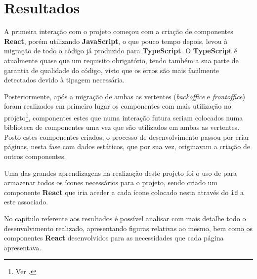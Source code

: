 \section{Resultados}

A primeira interação com o projeto começou com a criação de componentes \textbf{React}, porém utilizando \textbf{JavaScript}, o que pouco tempo depois, levou à migração de todo o código já produzido para \textbf{TypeScript}. O \textbf{TypeScript} é atualmente quase que um requisito obrigatório, tendo também a sua parte de garantia de qualidade do código, visto que os erros são mais facilmente detectados devido à tipagem necessária.

Posteriormente, após a migração de ambas as vertentes (\textit{backoffice} e \textit{frontoffice}) foram realizados em primeiro lugar os componentes com mais utilização no projeto\footnote{Ver .}, componentes estes que numa interação futura seriam colocados numa biblioteca de componentes uma vez que são utilizados em ambas as vertentes. Posto estes componentes criados, o processo de desenvolvimento passou por criar páginas, nesta fase com dados estáticos, que por sua vez, originavam a criação de outros componentes.

Uma das grandes aprendizagens na realização deste projeto foi o uso de  \textbf{} para armazenar todos os ícones necessários para o projeto, sendo criado um componente \textbf{React} que iria aceder a cada ícone colocado nesta  através do \texttt{id} a este associado.

No capítulo referente aos resultados é possível analisar com mais detalhe todo o desenvolvimento realizado, apresentando figuras relativas ao mesmo, bem como os componentes \textbf{React} desenvolvidos para as necessidades que cada página apresentava.